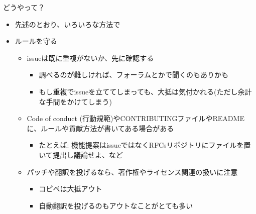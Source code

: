 \documentclass[
        unicode%
    ]{beamer}
\begin{document}
\begin{frame}{どうやって？}
    \begin{itemize}
        \item 先述のとおり、いろいろな方法で
        \pause
        \item ルールを守る
            \begin{itemize}
                \pause
                \item issueは既に重複がないか、先に確認する
                    \begin{itemize}
                        \item 調べるのが難しければ、フォーラムとかで聞くのもありかも
                        \item もし重複でissueを立ててしまっても、大抵は気付かれる(ただし余計な手間をかけてしまう)
                    \end{itemize}
                \pause
                \item Code of conduct (行動規範)やCONTRIBUTINGファイルやREADMEに、ルールや貢献方法が書いてある場合がある
                    \begin{itemize}
                        \item たとえば: 機能提案はissueではなくRFCsリポジトリにファイルを置いて提出し議論せよ、など
                    \end{itemize}
                \pause
                \item パッチや翻訳を投げるなら、著作権やライセンス関連の扱いに注意
                    \begin{itemize}
                        \item コピペは大抵アウト
                        \item 自動翻訳を投げるのもアウトなことがとても多い
                    \end{itemize}
            \end{itemize}
    \end{itemize}
\end{frame}
\end{document}
